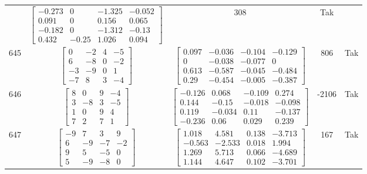 \documentclass[a4paper,12pt]{article}
\begin{document}
\begin{tabular}{c c c c c}
&
$\begin{bmatrix} -0.273 & 0 & -1.325 & -0.052 \\ 0.091 & 0 & 0.156 & 0.065 \\ -0.182 & 0 & -1.312 & -0.13 \\ 0.432 & -0.25 & 1.026 & 0.094 \end{bmatrix}$
&
308
&
Tak
\\
645
&
$\begin{bmatrix} 0 & -2 & 4 & -5 \\ 6 & -8 & 0 & -2 \\ -3 & -9 & 0 & 1 \\ -7 & 8 & 3 & -4 \end{bmatrix}$
&
$\begin{bmatrix} 0.097 & -0.036 & -0.104 & -0.129 \\ 0 & -0.038 & -0.077 & 0 \\ 0.613 & -0.587 & -0.045 & -0.484 \\ 0.29 & -0.454 & -0.005 & -0.387 \end{bmatrix}$
&
806
&
Tak
\\
646
&
$\begin{bmatrix} 8 & 0 & 9 & -4 \\ 3 & -8 & 3 & -5 \\ 1 & 0 & 9 & 4 \\ 7 & 2 & 7 & 1 \end{bmatrix}$
&
$\begin{bmatrix} -0.126 & 0.068 & -0.109 & 0.274 \\ 0.144 & -0.15 & -0.018 & -0.098 \\ 0.119 & -0.034 & 0.11 & -0.137 \\ -0.236 & 0.06 & 0.029 & 0.239 \end{bmatrix}$
&
-2106
&
Tak
\\
647
&
$\begin{bmatrix} -9 & 7 & 3 & 9 \\ 6 & -9 & -7 & -2 \\ 9 & 5 & -5 & 0 \\ 5 & -9 & -8 & 0 \end{bmatrix}$
&
$\begin{bmatrix} 1.018 & 4.581 & 0.138 & -3.713 \\ -0.563 & -2.533 & 0.018 & 1.994 \\ 1.269 & 5.713 & 0.066 & -4.689 \\ 1.144 & 4.647 & 0.102 & -3.701 \end{bmatrix}$
&
167
&
Tak
\\

\end{tabular}
\end{document}
